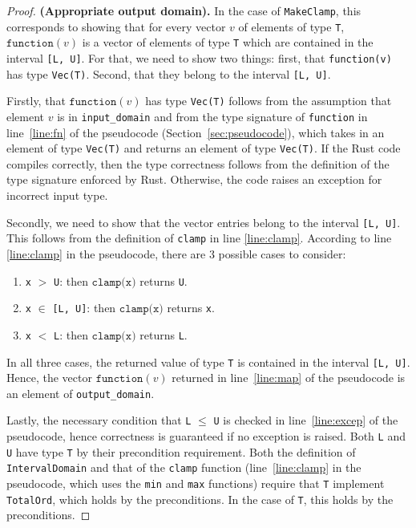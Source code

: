 \documentclass[11pt,a4paper]{article}
\theoremstyle{definition}
\newcommand{\T}{\texttt{T} }
\newcommand{\clamp}{\texttt{clamp}}
\newcommand{\function}{\texttt{function}}
\begin{document}
\begin{proof}
\textbf{(Appropriate output domain).} In the case of \texttt{MakeClamp}, this corresponds to showing that for every vector $v$ of elements of type \texttt{T}, $\function(v)$ is a vector of elements of type \texttt{T} which are contained in the interval \texttt{[L, U]}. For that, we need to show two things: first, that \texttt{function(v)} has type \texttt{Vec(T)}.
Second, that they belong to the interval \texttt{[L, U]}.

Firstly, that $\function(v)$ has type \texttt{Vec(T)} follows from the assumption that element $v$ is in \texttt{input\_domain} and from the type signature of \texttt{function} in line~\ref{line:fn} of the pseudocode (Section~\ref{sec:pseudocode}), which takes in an element of type \texttt{Vec(T)} and returns an element of type \texttt{Vec(T)}. If the Rust code compiles correctly, then the type correctness follows from the definition of the type signature enforced by Rust. Otherwise, the code raises an exception for incorrect input type. 

Secondly, we need to show that the vector entries belong to the interval \texttt{[L, U]}. This follows from the definition of \texttt{clamp} in line \ref{line:clamp}. According to line \ref{line:clamp} in the pseudocode, there are 3 possible cases to consider:
\begin{enumerate}
    \item \texttt{x} $>$ \texttt{U}: then $\clamp\texttt{(x)}$ returns \texttt{U}.
    \item \texttt{x} $\in$ \texttt{[L, U]}: then $\clamp\texttt{(x)}$ returns \texttt{x}.
    \item \texttt{x} $<$ \texttt{L}: then $\clamp\texttt{(x)}$ returns \texttt{L}.
\end{enumerate}
In all three cases, the returned value of type \T is contained in the interval \texttt{[L, U]}. Hence, the vector $\function(v)$ returned in line~\ref{line:map} of the pseudocode is an element of \texttt{output\_domain}.

Lastly, the necessary condition that \texttt{L} $\leq$ \texttt{U} is checked in line~\ref{line:excep} of the pseudocode, hence correctness is guaranteed if no exception is raised. Both \texttt{L} and \texttt{U} have type \texttt{T} by their precondition requirement. Both the definition of \texttt{IntervalDomain} and that of the \texttt{clamp} function (line~\ref{line:clamp} in the pseudocode, which uses the \texttt{min} and \texttt{max} functions) require that \texttt{T} implement \texttt{TotalOrd}, which holds by the preconditions. In the case of \texttt{T}, this holds by the preconditions.


\end{proof}
\end{document}
